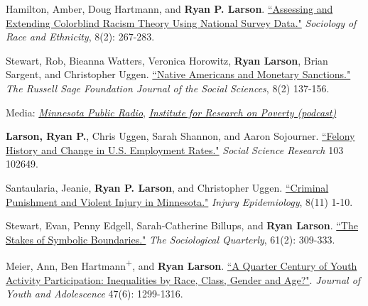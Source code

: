\documentclass[letterpaper]{article}
\newenvironment{publist}{%
  \begin{list}{}{%
    \setlength{\leftmargin}{0cm}   %
    \setlength{\labelwidth}{2cm}     %
    \setlength{\labelsep}{0.5cm}     %
  }%
}{%
  \end{list}%
}
\renewenvironment{itemize}{
  \begin{list}{}{
    \setlength{\leftmargin}{1.5em}
  }
}{
  \end{list}
}
\begin{document}
\begin{publist}
\item Hamilton, Amber, Doug Hartmann, and \textbf{Ryan P. Larson}. \href{https://ryanplarson.github.io/personal_site/pubs/hamilton_etal_22.pdf}{``Assessing and Extending Colorblind Racism Theory Using National Survey Data."} \textit{Sociology of Race and Ethnicity}, 8(2): 267-283.

\item Stewart, Rob, Bieanna Watters, Veronica Horowitz, \textbf{Ryan Larson}, Brian Sargent, and Christopher Uggen. \href{https://ryanplarson.github.io/personal_site/pubs/stewart_etal_22.pdf}{``Native Americans and Monetary Sanctions."} \textit{The Russell Sage Foundation Journal of the Social Sciences}, 8(2) 137-156.

\begin{itemize}
\item Media: \href{https://www.mprnews.org/story/2022/04/21/native-women-incarcerated}{\textit{Minnesota Public Radio}}, \href{https://www.irp.wisc.edu/resource/brieanna-watters-and-robert-stewart-on-native-americans-and-monetary-sanctions/}{\textit{Institute for Research on Poverty (podcast)}}
\end{itemize}

\item[\textbf{2021}] \textbf{Larson, Ryan P.}, Chris Uggen, Sarah Shannon, and Aaron Sojourner. \href{https://ryanplarson.github.io/personal_site/pubs/larson_etal_22.pdf}{``Felony History and Change in U.S. Employment Rates."} \textit{Social Science Research} 103 102649.

\item  Santaularia, Jeanie, \textbf{Ryan P. Larson}, and Christopher Uggen. \href{https://ryanplarson.github.io/personal_site/pubs/santaularia_etal_21.pdf}{``Criminal Punishment and Violent Injury in Minnesota."} \textit{Injury Epidemiology}, 8(11) 1-10.

\item[\textbf{2019}] Stewart, Evan, Penny Edgell, Sarah-Catherine Billups, and \textbf{Ryan Larson}. \href{https://ryanplarson.github.io/personal_site/pubs/stewart_etal_19.pdf}{``The Stakes of Symbolic Boundaries."} \textit{The Sociological Quarterly}, 61(2): 309-333.

\item[\textbf{2018}] Meier, Ann, Ben Hartmann\textsuperscript{+}, and \textbf{Ryan Larson}.  \href{https://ryanplarson.github.io/personal_site/pubs/meier_etal_18.pdf}{``A Quarter Century of Youth Activity Participation: Inequalities by Race, Class, Gender and Age?"}. \textit{Journal of Youth and Adolescence} 47(6): 1299-1316.


\end{publist}
\end{document}
